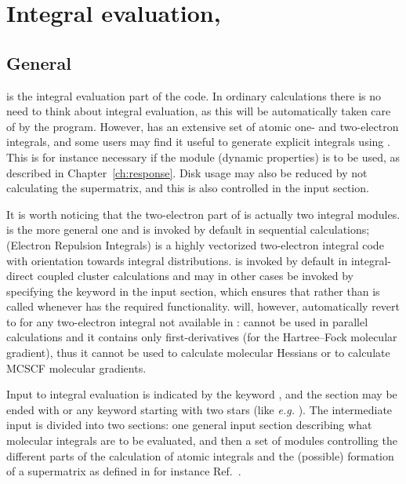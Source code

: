 \chapter{Integral evaluation, {\her}}\label{ch:hermit}

\section{General}\label{sec:herminp}

    {\her} is the integral evaluation part of the code. In ordinary
calculations there is no need to think about integral evaluation, as
this will be automatically taken care of by the program. However,
{\her} has an extensive set of atomic one- and two-electron
integrals,
and some users may find it useful to generate explicit integrals using
{\her}. This is for instance necessary if the {\resp} module (dynamic
properties) is to be
used, as described in Chapter~\ref{ch:response}. Disk usage may also
be reduced by not calculating the
supermatrix, and this is also controlled in the
 input section.

It is worth noticing that the two-electron part of {\her} is actually
two integral modules. {\twoint} is the more general one and is invoked by
default in sequential calculations; {\eri} (Electron Repulsion
Integrals) is a highly vectorized two-electron integral code with
orientation towards integral distributions. {\eri} is
invoked by default in integral-direct coupled cluster calculations and
may in other cases be invoked by specifying the  keyword
in the  input section, which ensures that {\eri}
rather than {\twoint} is called whenever {\eri} has the required
functionality. {\dalton} will, however, automatically revert to
{\twoint} for any two-electron integral not available in {\eri}:
{{\eri} cannot be used in parallel
calculations and it contains only first-derivatives (for
the Hartree--Fock molecular gradient), thus it cannot be used to calculate
molecular Hessians or to calculate MCSCF molecular gradients.}

    Input to integral evaluation is
indicated by the keyword , and the section may be
ended with  or any keyword starting with two stars
(like {\it e.g.\/} ). The intermediate input is
divided into two sections: one general input section describing
what molecular integrals are to be evaluated, and then a set of
modules controlling the different parts of the calculation of
atomic integrals and the (possible) formation of
a supermatrix as defined in for instance Ref.~\cite{pemsjaahborjcp74}.


